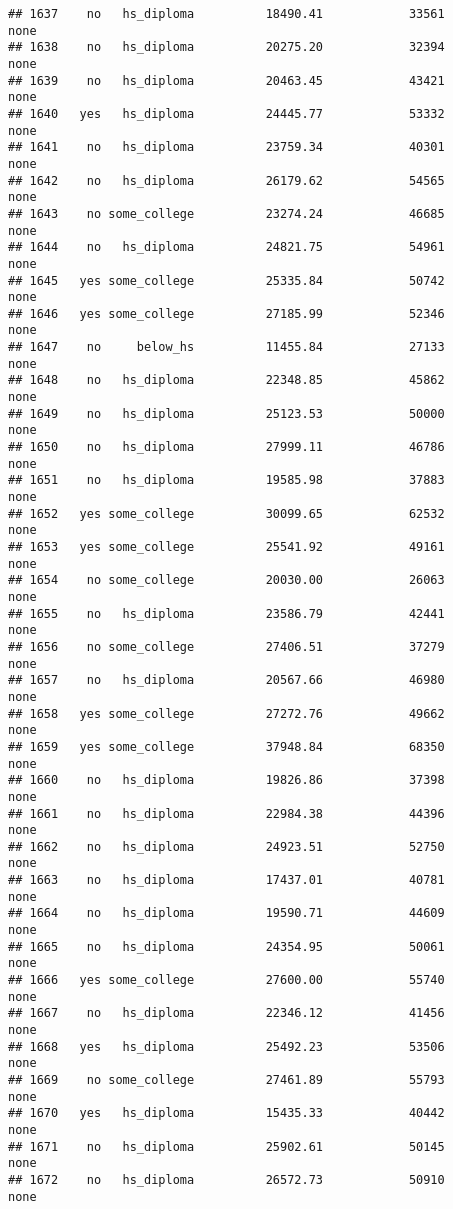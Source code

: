 \documentclass[
]{article}
\begin{document}
\begin{verbatim}
## 1637    no   hs_diploma          18490.41            33561        none
## 1638    no   hs_diploma          20275.20            32394        none
## 1639    no   hs_diploma          20463.45            43421        none
## 1640   yes   hs_diploma          24445.77            53332        none
## 1641    no   hs_diploma          23759.34            40301        none
## 1642    no   hs_diploma          26179.62            54565        none
## 1643    no some_college          23274.24            46685        none
## 1644    no   hs_diploma          24821.75            54961        none
## 1645   yes some_college          25335.84            50742        none
## 1646   yes some_college          27185.99            52346        none
## 1647    no     below_hs          11455.84            27133        none
## 1648    no   hs_diploma          22348.85            45862        none
## 1649    no   hs_diploma          25123.53            50000        none
## 1650    no   hs_diploma          27999.11            46786        none
## 1651    no   hs_diploma          19585.98            37883        none
## 1652   yes some_college          30099.65            62532        none
## 1653   yes some_college          25541.92            49161        none
## 1654    no some_college          20030.00            26063        none
## 1655    no   hs_diploma          23586.79            42441        none
## 1656    no some_college          27406.51            37279        none
## 1657    no   hs_diploma          20567.66            46980        none
## 1658   yes some_college          27272.76            49662        none
## 1659   yes some_college          37948.84            68350        none
## 1660    no   hs_diploma          19826.86            37398        none
## 1661    no   hs_diploma          22984.38            44396        none
## 1662    no   hs_diploma          24923.51            52750        none
## 1663    no   hs_diploma          17437.01            40781        none
## 1664    no   hs_diploma          19590.71            44609        none
## 1665    no   hs_diploma          24354.95            50061        none
## 1666   yes some_college          27600.00            55740        none
## 1667    no   hs_diploma          22346.12            41456        none
## 1668   yes   hs_diploma          25492.23            53506        none
## 1669    no some_college          27461.89            55793        none
## 1670   yes   hs_diploma          15435.33            40442        none
## 1671    no   hs_diploma          25902.61            50145        none
## 1672    no   hs_diploma          26572.73            50910        none

\end{verbatim}
\end{document}
